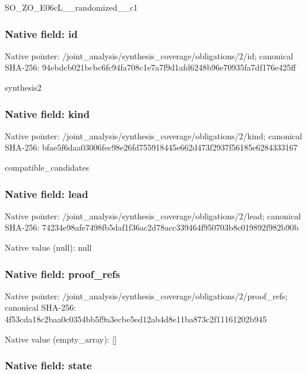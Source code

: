 \documentclass[10pt,a4paper]{article}
\begin{document}
SO\_ZO\_E06cL\_\_randomized\_\_c1


\subsubsection{Native field: id}


Native pointer: /joint\_analysis/synthesi\allowbreak{}s\_coverage/obligations/2\allowbreak{}/id; canonical SHA-256: 94ebdcb021bcbc6fc94fa708\allowbreak{}c1e7a7f9d1afd6248b96e709\allowbreak{}35fa7df176e425ff


synthesis2


\subsubsection{Native field: kind}


Native pointer: /joint\_analysis/synthesi\allowbreak{}s\_coverage/obligations/2\allowbreak{}/kind; canonical SHA-256: bfae5f6daa03006fec98e26f\allowbreak{}d755918445e662d473f2937f\allowbreak{}56185e6284333167


compatible\_candidates


\subsubsection{Native field: lead}


Native pointer: /joint\_analysis/synthesi\allowbreak{}s\_coverage/obligations/2\allowbreak{}/lead; canonical SHA-256: 74234e98afe7498fb5daf1f3\allowbreak{}6ac2d78acc339464f950703b\allowbreak{}8c019892f982b90b



Native value (null): null



\subsubsection{Native field: proof\_refs}


Native pointer: /joint\_analysis/synthesi\allowbreak{}s\_coverage/obligations/2\allowbreak{}/proof\_refs; canonical SHA-256: 4f53cda18c2baa0c0354bb5f\allowbreak{}9a3ecbe5ed12ab4d8e11ba87\allowbreak{}3c2f11161202b945



Native value (empty\_array): []



\subsubsection{Native field: state}
\end{document}
